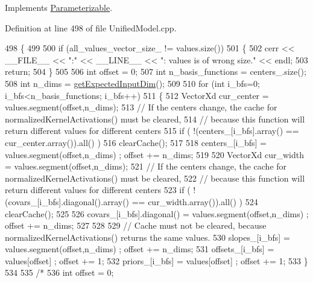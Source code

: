 Implements \hyperlink{classDmpBbo_1_1Parameterizable_acef2ee975b497baf60b1f38da2b65f0d}{Parameterizable}.



Definition at line 498 of file Unified\+Model.\+cpp.


\begin{DoxyCode}
498                                                                \{
499 
500   \textcolor{keywordflow}{if} (all\_values\_vector\_size\_ != values.size())
501   \{
502     cerr << \_\_FILE\_\_ << \textcolor{stringliteral}{":"} << \_\_LINE\_\_ << \textcolor{stringliteral}{": values is of wrong size."} << endl;
503     \textcolor{keywordflow}{return};
504   \}
505 
506   \textcolor{keywordtype}{int} offset = 0;
507   \textcolor{keywordtype}{int} n\_basis\_functions = centers\_.size();
508   \textcolor{keywordtype}{int} n\_dims = \hyperlink{classDmpBbo_1_1UnifiedModel_af5a550bcf65d5a29a153a594cc4e3fa1}{getExpectedInputDim}();
509   
510   \textcolor{keywordflow}{for} (\textcolor{keywordtype}{int} i\_bfs=0; i\_bfs<n\_basis\_functions; i\_bfs++)
511   \{
512     VectorXd cur\_center = values.segment(offset,n\_dims);
513     \textcolor{comment}{// If the centers change, the cache for normalizedKernelActivations() must be cleared,}
514     \textcolor{comment}{// because this function will return different values for different centers}
515     \textcolor{keywordflow}{if} ( !(centers\_[i\_bfs].array() == cur\_center.array()).all() )
516       clearCache();
517     
518     centers\_[i\_bfs]           = values.segment(offset,n\_dims) ;   offset += n\_dims;
519     
520     VectorXd cur\_width = values.segment(offset,n\_dims);
521     \textcolor{comment}{// If the centers change, the cache for normalizedKernelActivations() must be cleared,}
522     \textcolor{comment}{// because this function will return different values for different centers}
523     \textcolor{keywordflow}{if} ( !(covars\_[i\_bfs].diagonal().array() == cur\_width.array()).all() )
524       clearCache();
525     
526     covars\_[i\_bfs].diagonal() = values.segment(offset,n\_dims) ;   offset += n\_dims;
527     
528     
529     \textcolor{comment}{// Cache must not be cleared, because normalizedKernelActivations() returns the same values.}
530     slopes\_[i\_bfs]            = values.segment(offset,n\_dims) ;   offset += n\_dims;
531     offsets\_[i\_bfs]           = values[offset]                ;   offset += 1;
532     priors\_[i\_bfs]            = values[offset]                ;   offset += 1;
533   \}
534   
535   \textcolor{comment}{/*}
536 \textcolor{comment}{  int offset = 0;}

\end{DoxyCode}
